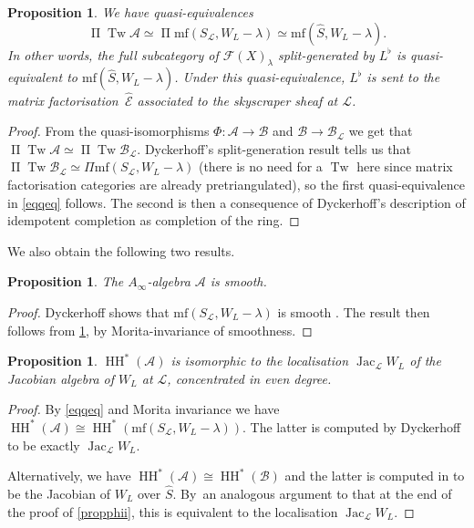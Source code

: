 \documentclass[JEP,XML,SOM,Unicode,NoEqCountersInSection,NoFloatCountersInSection,published]{cedram}
\newtheorem{proposition}[theorem]{Proposition}
\theoremstyle{definition}
\newcommand{\LL}{L^\flat}
\newcommand{\hatS}{\widehat{S}}
\newcommand{\hatE}{\widehat{\calE}}
\newcommand{\calA}{\mathcal{A}}
\newcommand{\calB}{\mathcal{B}}
\newcommand{\calE}{\mathcal{E}}
\newcommand{\calL}{\mathcal{L}}
\newcommand{\Fuk}{\mathcal{F}}
\newcommand{\mf}{\mathrm{mf}}
\newcommand{\HH}{\operatorname{HH}}
\newcommand{\Jac}{\operatorname{Jac}}
\newcommand{\Tw}{\operatorname{Tw}}
\newcommand{\oPi}{\operatorname{\Pi}}
\newcommand{\PiTw}{\oPi \Tw}
\begin{document}
\begin{proposition}
\label{propCategoryDescriptions}
We have quasi-equivalences
\begin{equation}
\label{eqqeq}
\PiTw \calA \simeq \operatorname{\Pi} \mf(S_\calL, W_L - \lambda) \simeq \mf(\hatS, W_L - \lambda).
\end{equation}
In other words, the full subcategory of $\Fuk(X)_\lambda$ split-generated by $\LL$ is quasi-equivalent to $\mf(\hatS, W_L - \lambda)$. Under this quasi-equivalence, $\LL$ is sent to the matrix factorisation~$\hatE$ associated to the skyscraper sheaf at $\calL$.
\end{proposition}
\begin{proof}
From the quasi-isomorphisms $\Phi : \calA \to \calB$ and $\calB \to \calB_\calL$ we get that $\PiTw \calA \simeq \PiTw \calB_\calL$. Dyckerhoff's split-generation result tells us that $\PiTw \calB_\calL \simeq \Pi \mf(S_\calL, W_L - \lambda)$ (there is no need for a $\Tw$ here since matrix factorisation categories are already pretriangulated), so the first quasi-equivalence in \eqref{eqqeq} follows. The second is then a consequence of Dyckerhoff's description \cite[Th.\,5.7]{Dyckerhoff} of idempotent completion as completion of the ring.
\end{proof}

We also obtain the following two results.

\begin{proposition}
\label{propAsmooth}
The $A_\infty$-algebra $\calA$ is smooth.
\end{proposition}
\begin{proof}
Dyckerhoff shows that $\mf(S_\calL, W_L - \lambda)$ is smooth \cite[\S 7]{Dyckerhoff}. The result then follows from \cref{propCategoryDescriptions}, by Morita-invariance of smoothness.
\end{proof}

\begin{proposition}
\label{propAHH}
$\HH^*(\calA)$ is isomorphic to the localisation $\Jac_\calL W_L$ of the Jacobian algebra of $W_L$ at $\calL$, concentrated in even degree.
\end{proposition}
\begin{proof}
By \eqref{eqqeq} and Morita invariance we have $\HH^*(\calA) \cong \HH^*( \mf (S_\calL, W_L - \lambda) )$. The latter is computed by Dyckerhoff \cite[Cor.\,6.5]{Dyckerhoff} to be exactly $\Jac_\calL W_L$.

Alternatively, we have $\HH^*(\calA) \cong \HH^*(\calB)$ and the latter is computed in \cite[Th.\,4]{SmithSuperfiltered} to be the Jacobian of $W_L$ over $\hatS$. By~an analogous argument to that at the end of the proof of \cref{propphii}, this is equivalent to the localisation $\Jac_\calL W_L$.
\end{proof}
\end{document}
